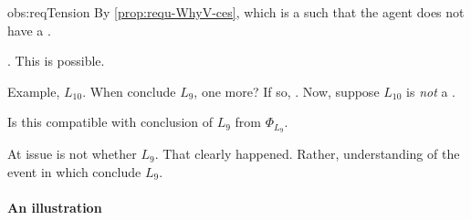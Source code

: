 \begin{note}
  \begin{motivation}{obs:reqTension}
    By \autoref{prop:requ-WhyV-ces}, \fc{} which is a \requ{} such that the agent does not have a \ros{}.

    \supportII{}.
    This is possible.
  \end{motivation}

  Example, \(L_{10}\).
  When conclude \(L_{9}\), one more?
  If so, \fc{}.
  Now, suppose \(L_{10}\) is \emph{not} a \fc{}.

  Is this compatible with conclusion of \(L_{9}\) from \(\Phi_{L_{9}}\).

  At issue is not whether \eval{} \(L_{9}\).
  That clearly happened.
  Rather, understanding of the event in which conclude \(L_{9}\).
\end{note}





\paragraph{An illustration}



